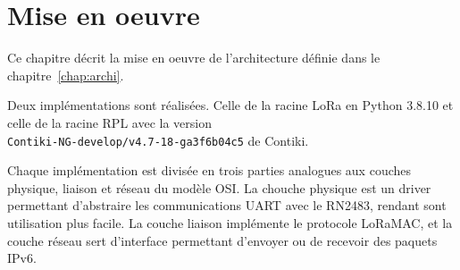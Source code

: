 \renewcommand{\leftmark}{MISE EN OEUVRE}
\chapter{Mise en oeuvre}\label{chap:work}
    Ce chapitre décrit la mise en oeuvre de l'architecture définie dans le
    chapitre~\ref{chap:archi}.

    Deux implémentations sont réalisées. Celle de la racine LoRa en Python 3.8.10 et celle de la racine RPL avec la version\\ \texttt{Contiki-NG-develop/v4.7-18-ga3f6b04c5} de Contiki.

    Chaque implémentation est divisée en trois parties analogues aux couches physique, liaison et réseau du modèle OSI. La chouche physique est un driver permettant d'abstraire les communications UART avec le RN2483, rendant sont utilisation plus facile. La couche liaison implémente le protocole LoRaMAC, et la couche réseau sert d'interface permettant d'envoyer ou de recevoir des paquets IPv6.

